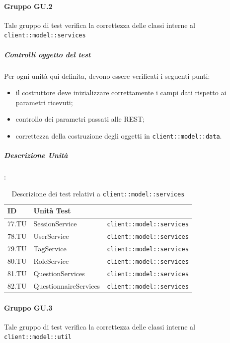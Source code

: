 \documentclass[12pt,a4paper]{article}
\begin{document}
	\paragraph{Gruppo GU.2 }
	Tale gruppo di test verifica la correttezza delle classi interne al  \texttt{client::model::services}
	
	\subparagraph{Controlli oggetto del test}
	Per ogni unità  qui definita, devono essere verificati i seguenti punti:
	
	\begin{itemize}
		\item il costruttore deve inizializzare correttamente i campi dati rispetto ai parametri ricevuti;
		\item controllo dei parametri passati alle  REST;
		\item correttezza della costruzione degli oggetti in \texttt{client::model::data}.
	\end{itemize}
	
	\subparagraph{Descrizione Unità}:
	
	\begin{table}[H]
		\begin{center}
			\begin{tabular}{p{} p{0.4\textwidth} p{}}
				\toprule
				\textbf{ID}   & \textbf{Unità Test}	& \textbf{\mgls{package}} \\ \midrule
				\midrule
				77.TU & SessionService & \texttt{client::model::services}\\ \midrule
				78.TU & UserService & \texttt{client::model::services}\\ \midrule
				79.TU & TagService & \texttt{client::model::services}\\ \midrule
				80.TU & RoleService & \texttt{client::model::services}\\ \midrule
				81.TU & QuestionServices & \texttt{client::model::services}\\ \midrule
				82.TU & QuestionnaireServices & \texttt{client::model::services}\\ \midrule
				\bottomrule
			\end{tabular}
		\end{center}
		\caption{Descrizione dei test relativi a \texttt{client::model::services}}
	\end{table}
	
	\paragraph{Gruppo GU.3}
	Tale gruppo di test verifica la correttezza delle classi interne al  \texttt{client::model::util}
	
\end{document}

